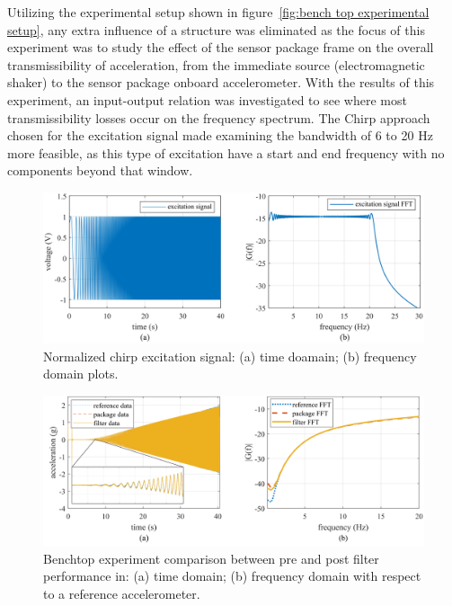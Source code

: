 \documentclass[]{spie}  %
\begin{document}
	
	Utilizing the experimental setup shown in figure~\ref{fig:bench top experimental setup}, any extra influence of a structure was eliminated as the focus of this experiment was to study the effect of the sensor package frame on the overall transmissibility of acceleration, from the immediate source (electromagnetic shaker) to the sensor package onboard accelerometer. With the results of this experiment, an input-output relation was investigated to see where most transmissibility losses occur on the frequency spectrum. The Chirp approach chosen for the excitation signal made examining the bandwidth of 6 to 20 Hz more feasible, as this type of excitation have a start and end frequency with no components beyond that window.
	
	\begin{figure} [H]
		\centering
		\includegraphics[width=6 in]{figures/excitation signal Time and Frequency domain chirp plot.png}
		\caption{Normalized chirp excitation signal: (a) time doamain; (b) frequency domain plots.} 
		\label{fig:excitation signal Time and Frequency domain chirp plot} 
	\end{figure}

	\begin{figure} [H]
		\centering
		\includegraphics[width=6 in]{figures/Chirp Benchtop Filtered.png}
		\caption{Benchtop experiment comparison between pre and post filter performance in: (a) time domain; (b) frequency domain with respect to a reference accelerometer.} 
		\label{fig:excitation signal plot} 
	\end{figure}
	
\end{document}
